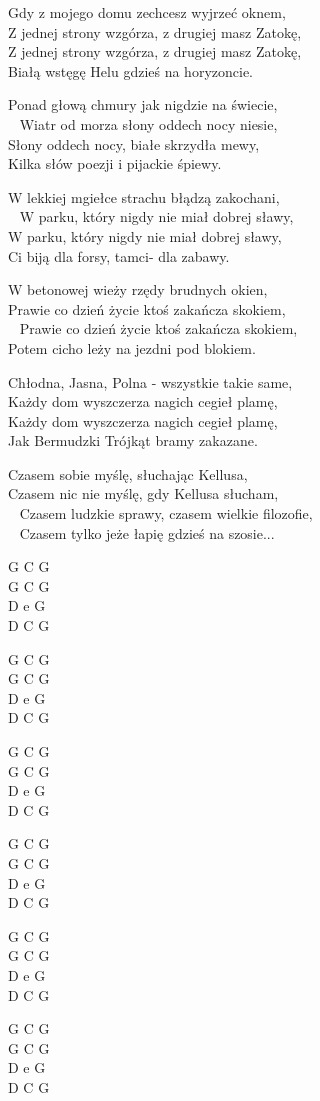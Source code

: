 \begin{text}
Gdy z mojego domu zechcesz wyjrzeć oknem,\\
Z jednej strony wzgórza, z drugiej masz Zatokę,\\
Z jednej strony wzgórza, z drugiej masz Zatokę,\\
Białą wstęgę Helu gdzieś na horyzoncie. 

Ponad głową chmury jak nigdzie na świecie,\\ 
Wiatr od morza słony oddech nocy niesie,\\
Słony oddech nocy, białe skrzydła mewy, \\
Kilka słów poezji i pijackie śpiewy.

W lekkiej mgiełce strachu błądzą zakochani,\\ 
W parku, który nigdy nie miał dobrej sławy, \\
W parku, który nigdy nie miał dobrej sławy,\\
Ci biją dla forsy, tamci- dla zabawy. 

W betonowej wieży rzędy brudnych okien, \\
Prawie co dzień życie ktoś zakańcza skokiem,\\ 
Prawie co dzień życie ktoś zakańcza skokiem,\\
Potem cicho leży na jezdni pod blokiem. 

Chłodna, Jasna, Polna - wszystkie takie same,\\
Każdy dom wyszczerza nagich cegieł plamę,\\
Każdy dom wyszczerza nagich cegieł plamę,\\
Jak Bermudzki Trójkąt bramy zakazane. 

Czasem sobie myślę, słuchając Kellusa,\\
Czasem nic nie myślę, gdy Kellusa słucham,\\ 
Czasem ludzkie sprawy, czasem wielkie filozofie,\\ 
Czasem tylko jeże łapię gdzieś na szosie...
\end{text}
\begin{chord}
    G C G\\
    G C G\\
    D e G\\
    D C G

G C G\\
G C G\\
D e G\\
D C G

G C G\\
G C G\\
D e G\\
D C G

G C G\\
G C G\\
D e G\\
D C G

G C G\\
G C G\\
D e G\\
D C G

G C G\\
G C G\\
D e G\\
D C G
\end{chord}